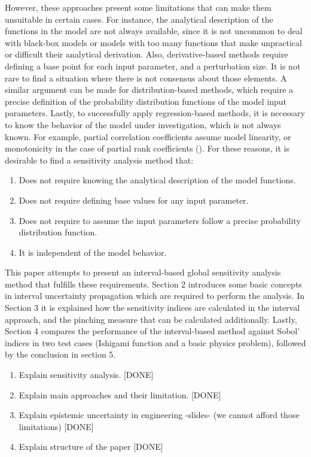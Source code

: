 \documentclass[twocolumn]{rps-esrel2022}
\begin{document}
However, these approaches present some limitations that can make them unsuitable in certain cases.
For instance, the analytical description of the functions in the model are not always available, since it is not uncommon to deal with black-box models or
models with too many functions that make unpractical or difficult their analytical derivation.
Also, derivative-based methods require defining a base point for each input parameter, and a perturbation size.
It is not rare to find a situation where there is not consensus about those elements.
A similar argument can be made for distribution-based methods, which require a precise definition of the probability distribution functions of the model input
parameters.
Lastly, to successfully apply regression-based methods, it is necessary to know the behavior of the model under investigation, which is not always known.
For example, partial correlation coefficients assume model linearity, or monotonicity in the case of partial rank coefficients (\cite{saltelli1990non}).
For these reasons, it is desirable to find a sensitivity analysis method that:

\begin{enumerate}
	\item Does not require knowing the analytical description of the model functions.
	\item Does not require defining base values for any input parameter.
	\item Does not require to assume the input parameters follow a precise probability distribution function.
	\item It is independent of the model behavior.
\end{enumerate}

This paper attempts to present an interval-based global sensitivity analysis method that fulfills these requirements.
Section 2 introduces some basic concepts in interval uncertainty propagation which are required to perform the analysis.
In Section 3 it is explained how the sensitivity indices are calculated in the interval approach, and the
pinching measure that can be calculated additionally.
Lastly, Section 4 compares the performance of the interval-based method against Sobol' indices in two test cases
(Ishigami function and a basic physics problem), followed by the conclusion in section 5.

\begin{enumerate}
	\item Explain sensitivity analysis. [DONE]
	\item Explain main approaches and their limitation. [DONE]
	\item Explain epistemic uncertainty in engineering -slides- (we cannot afford those limitations) [DONE]
	\item Explain structure of the paper [DONE]
\end{enumerate}
\end{document}
